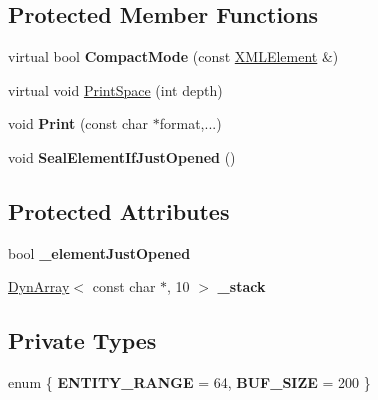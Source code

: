 \subsection*{Protected Member Functions}
\begin{DoxyCompactItemize}
\item 
\hypertarget{classtinyxml2_1_1_x_m_l_printer_a38e1ed5a779bdf63eda9e808f7a6de66}{}virtual bool {\bfseries Compact\+Mode} (const \hyperlink{classtinyxml2_1_1_x_m_l_element}{X\+M\+L\+Element} \&)\label{classtinyxml2_1_1_x_m_l_printer_a38e1ed5a779bdf63eda9e808f7a6de66}

\item 
virtual void \hyperlink{classtinyxml2_1_1_x_m_l_printer_a01148e2ebe6776e38c5a3e41bc5feb74}{Print\+Space} (int depth)
\item 
\hypertarget{classtinyxml2_1_1_x_m_l_printer_ab30210a7f32e45634e7a45137bf6fdf6}{}void {\bfseries Print} (const char $\ast$format,...)\label{classtinyxml2_1_1_x_m_l_printer_ab30210a7f32e45634e7a45137bf6fdf6}

\item 
\hypertarget{classtinyxml2_1_1_x_m_l_printer_ac6e2c72c5d796f5b4de6ce81ca95e3fa}{}void {\bfseries Seal\+Element\+If\+Just\+Opened} ()\label{classtinyxml2_1_1_x_m_l_printer_ac6e2c72c5d796f5b4de6ce81ca95e3fa}

\end{DoxyCompactItemize}
\subsection*{Protected Attributes}
\begin{DoxyCompactItemize}
\item 
\hypertarget{classtinyxml2_1_1_x_m_l_printer_ac07169d58b465214a2b1fa306e617c26}{}bool {\bfseries \+\_\+element\+Just\+Opened}\label{classtinyxml2_1_1_x_m_l_printer_ac07169d58b465214a2b1fa306e617c26}

\item 
\hypertarget{classtinyxml2_1_1_x_m_l_printer_a99d59e67e084714541bee3ae43884bef}{}\hyperlink{classtinyxml2_1_1_dyn_array}{Dyn\+Array}$<$ const char $\ast$, 10 $>$ {\bfseries \+\_\+stack}\label{classtinyxml2_1_1_x_m_l_printer_a99d59e67e084714541bee3ae43884bef}

\end{DoxyCompactItemize}
\subsection*{Private Types}
\begin{DoxyCompactItemize}
\item 
\hypertarget{classtinyxml2_1_1_x_m_l_printer_abd08e8da55b22d059d0484c53db1fae8}{}enum \{ {\bfseries E\+N\+T\+I\+T\+Y\+\_\+\+R\+A\+N\+G\+E} = 64, 
{\bfseries B\+U\+F\+\_\+\+S\+I\+Z\+E} = 200
 \}\label{classtinyxml2_1_1_x_m_l_printer_abd08e8da55b22d059d0484c53db1fae8}

\end{DoxyCompactItemize}
